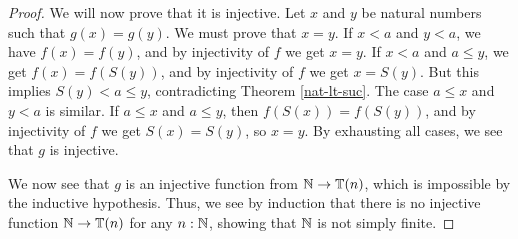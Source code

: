 \documentclass[../math.tex]{subfiles}
\begin{document}
\begin{proof}
    We will now prove that it is injective.  Let $x$ and $y$ be natural numbers
    such that $g(x) = g(y)$.  We must prove that $x = y$.  If $x < a$ and $y <
    a$, we have $f(x) = f(y)$, and by injectivity of $f$ we get $x = y$.  If $x
    < a$ and $a \leq y$, we get $f(x) = f(S(y))$, and by injectivity of $f$ we
    get $x = S(y)$.  But this implies $S(y) < a \leq y$, contradicting Theorem
    \ref{nat-lt-suc}.  The case $a \leq x$ and $y < a$ is similar.  If $a \leq
    x$ and $a \leq y$, then $f(S(x)) = f(S(y))$, and by injectivity of $f$ we
    get $S(x) = S(y)$, so $x = y$.  By exhausting all cases, we see that $g$ is
    injective.

    We now see that $g$ is an injective function from $\mathbb{N} \to \mathbb{T}(n)$, which is
    impossible by the inductive hypothesis.  Thus, we see by induction that
    there is no injective function $\mathbb{N} \to \mathbb{T}(n)$ for any $n : \mathbb{N}$, showing that
    $\mathbb{N}$ is not simply finite.
\end{proof}
\end{document}
